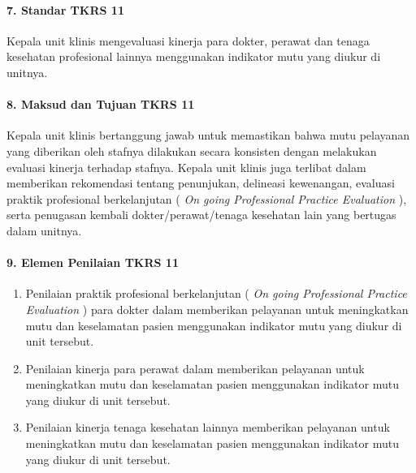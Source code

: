 \documentclass[
]{book}
\providecommand{\tightlist}{%
  \setlength{\itemsep}{0pt}\setlength{\parskip}{0pt}}
\begin{document}
\hypertarget{standar-tkrs-11}{%
\paragraph*{7. Standar TKRS 11}\label{standar-tkrs-11}}

Kepala unit klinis mengevaluasi kinerja para dokter, perawat dan tenaga kesehatan profesional lainnya menggunakan indikator mutu yang diukur di unitnya.

\hypertarget{maksud-dan-tujuan-tkrs-11}{%
\paragraph*{8. Maksud dan Tujuan TKRS 11}\label{maksud-dan-tujuan-tkrs-11}}

Kepala unit klinis bertanggung jawab untuk memastikan bahwa mutu pelayanan yang diberikan oleh stafnya dilakukan secara konsisten dengan melakukan evaluasi kinerja terhadap stafnya. Kepala unit klinis juga terlibat dalam memberikan rekomendasi tentang penunjukan, delineasi kewenangan, evaluasi praktik profesional berkelanjutan ( \emph{On going Professional Practice Evaluation} ), serta penugasan kembali dokter/perawat/tenaga kesehatan lain yang bertugas dalam unitnya.

\hypertarget{elemen-penilaian-tkrs-11}{%
\paragraph*{9. Elemen Penilaian TKRS 11}\label{elemen-penilaian-tkrs-11}}

\begin{enumerate}
\def\labelenumi{\alph{enumi}.}
\tightlist
\item
  Penilaian praktik profesional berkelanjutan ( \emph{On going Professional Practice Evaluation} ) para dokter dalam memberikan pelayanan untuk meningkatkan mutu dan keselamatan pasien menggunakan indikator mutu yang diukur di unit tersebut.
\item
  Penilaian kinerja para perawat dalam memberikan pelayanan untuk meningkatkan mutu dan keselamatan pasien menggunakan indikator mutu yang diukur di unit tersebut.
\item
  Penilaian kinerja tenaga kesehatan lainnya memberikan pelayanan untuk meningkatkan mutu dan keselamatan pasien menggunakan indikator mutu yang diukur di unit tersebut.
\end{enumerate}
\end{document}
